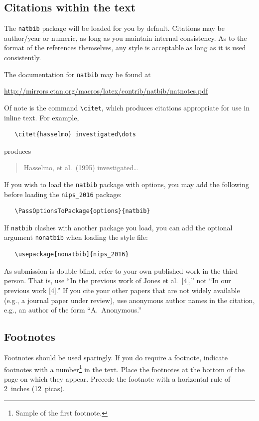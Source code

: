\documentclass{article}
\begin{document}
\subsection{Citations within the text}

The \verb+natbib+ package will be loaded for you by default.
Citations may be author/year or numeric, as long as you maintain
internal consistency.  As to the format of the references themselves,
any style is acceptable as long as it is used consistently.

The documentation for \verb+natbib+ may be found at
\begin{center}
  \url{http://mirrors.ctan.org/macros/latex/contrib/natbib/natnotes.pdf}
\end{center}
Of note is the command \verb+\citet+, which produces citations
appropriate for use in inline text.  For example,
\begin{verbatim}
   \citet{hasselmo} investigated\dots
\end{verbatim}
produces
\begin{quote}
  Hasselmo, et al.\ (1995) investigated\dots
\end{quote}

If you wish to load the \verb+natbib+ package with options, you may
add the following before loading the \verb+nips_2016+ package:
\begin{verbatim}
   \PassOptionsToPackage{options}{natbib}
\end{verbatim}

If \verb+natbib+ clashes with another package you load, you can add
the optional argument \verb+nonatbib+ when loading the style file:
\begin{verbatim}
   \usepackage[nonatbib]{nips_2016}
\end{verbatim}

As submission is double blind, refer to your own published work in the
third person. That is, use ``In the previous work of Jones et
al.\ [4],'' not ``In our previous work [4].'' If you cite your other
papers that are not widely available (e.g., a journal paper under
review), use anonymous author names in the citation, e.g., an author
of the form ``A.\ Anonymous.''

\subsection{Footnotes}

Footnotes should be used sparingly.  If you do require a footnote,
indicate footnotes with a number\footnote{Sample of the first
  footnote.} in the text. Place the footnotes at the bottom of the
page on which they appear.  Precede the footnote with a horizontal
rule of 2~inches (12~picas).
\end{document}

